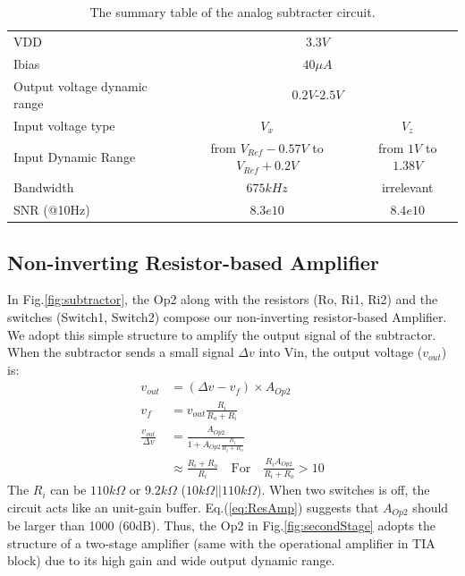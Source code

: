 {\begin{table}[!htb]
    {\fontfamily{}\fontsize{10}{14}\selectfont
    \centering
    \begin{tabular}{l|c|c}
        VDD & \multicolumn{2}{|c}{$3.3V$}\\
        Ibias & \multicolumn{2}{|c}{$40\mu A$}\\
        Output voltage dynamic range & \multicolumn{2}{|c}{$0.2V$-$2.5V$}\\
        \hline
        \hline
        Input voltage type & $V_x$ & $V_z$\\
        \cline{2-3}
        Input Dynamic Range & from $V_{Ref} - 0.57V$ to $V_{Ref} + 0.2V$ & from $1V$ to $1.38V$ \\
        Bandwidth & $675k Hz$& irrelevant \\
        SNR (@10Hz) & $8.3e10$ & $8.4e10$ \\
    \end{tabular}
    \caption{The summary table of the analog subtracter circuit.}
    \label{tb:Subtractor}
    }
\end{table}

\subsection{Non-inverting Resistor-based Amplifier}

In Fig.\ref{fig:subtractor}, the Op2 along with the resistors (Ro, Ri1, Ri2) and the switches (Switch1, Switch2) compose our non-inverting resistor-based Amplifier.
We adopt this simple structure to amplify the output signal of the subtractor.
When the subtractor sends a small signal $\Delta v$ into Vin, the output voltage ($v_{out}$) is:
\begin{align}
    v_{out} &= (\Delta v - v_f) \times A_{Op2} \\
    v_f &= v_{out} \frac{R_i}{R_o + R_i} \\
    \frac{v_{out}}{\Delta v} &= \frac{A_{Op2}}{1 + A_{Op2}\frac{R_i}{R_i + R_o}} \\
    &\approx \frac{R_i + R_o}{R_i} \quad \text{For} \quad \frac{R_iA_{Op2}}{R_i + R_o} > 10 \label{eq:ResAmp}
\end{align}
The $R_i$ can be  $110k\Omega$ or $9.2k\Omega$ ($10k\Omega||110k\Omega$).
When two switches is off, the circuit acts like an unit-gain buffer.
Eq.(\ref{eq:ResAmp}) suggests that $A_{Op2}$ should be larger than 1000 (60dB).
Thus, the Op2 in Fig.\ref{fig:secondStage} adopts the structure of a two-stage amplifier (same with the operational amplifier in TIA block) due to its high gain and wide output dynamic range.


}
